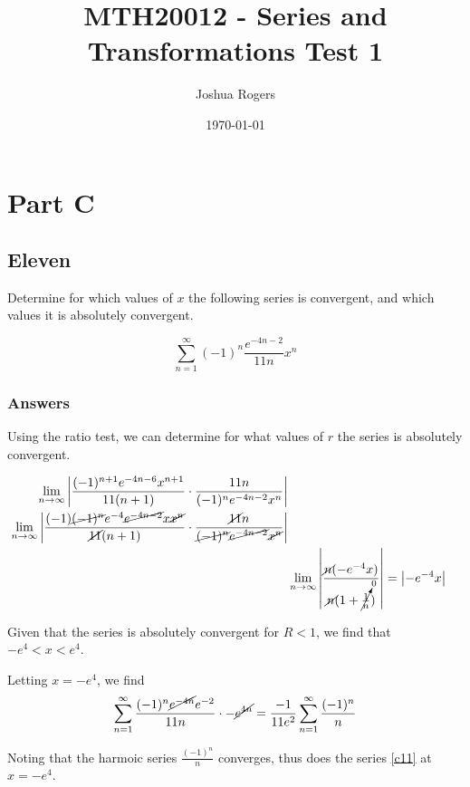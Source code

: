 \documentclass{article}
\title{\vspace{-4cm}MTH20012 - Series and Transformations Test 1}
\author{Joshua Rogers}
\date\today
\begin{document}
\maketitle 

\section*{Part C}
\subsection*{Eleven}

Determine for which values of $x$ the following series is convergent, and which values it is absolutely convergent.

\begin{equation}\label{c11}
\sum_{n=1}^{\infty} (-1)^n \frac{e^{-4n-2}}{11n} x^n
\end{equation}

\subsubsection*{Answers}

Using the ratio test, we can determine for what values of $r$ the series is absolutely convergent.

\begin{align*}
\lim_{n\to\infty} \left| \frac{(-1)^{n+1}e^{-4n-6}x^{n+1}}{11(n+1)} \cdot \frac{11n}{(-1)^ne^{-4n-2}x^n}\right| \\
\lim_{n\to\infty} \left| \frac{(-1)\cancel{(-1)^n}e^{-4}\cancel{e^{-4n-2}}x\cancel{x^{n}}}{\cancel{11}(n+1)} \cdot \frac{\cancel{11}n}{\cancel{(-1)^n}\cancel{e^{-4n-2}}\cancel{x^n}}\right|\\
&\lim_{n\to\infty} \left| \frac{\cancel{n}(-e^{-4}x)}{\cancel{n}(1+\cancelto{0}{\frac{1}{n}})}\right| = \left|-e^{-4}x\right|
\end{align*}

Given that the series is absolutely convergent for $R < 1$, we find that $-e^4 < x < e^4$.

Letting $x = -e^4$, we find
\begin{align*}
\sum_{n=1}^{\infty} \frac{(-1)^n\cancel{e^{-4n}}e^{-2}}{11n}\cdot -\cancel{e^{4n}} = \frac{-1}{11e^2} \sum_{n=1}^{\infty} \frac{(-1)^n}{n}
\end{align*}

Noting that the harmoic series $\frac{(-1)^n}{n}$ converges, thus does the series \ref{c11} at $x = -e^4$.
\end{document}
